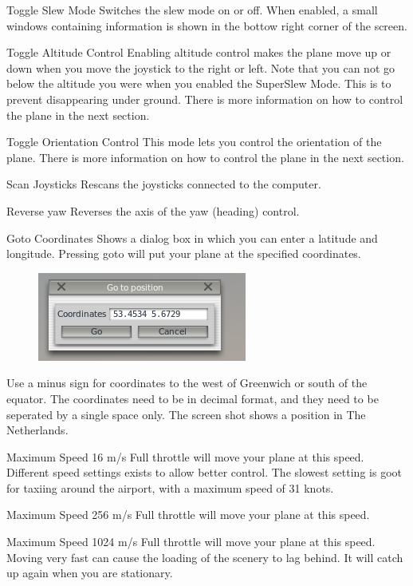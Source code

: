 \documentclass[a4paper,12pt]{article}
\newenvironment{vlist}[1]{%
\begin{list}{}{%
    \settowidth{\labelwidth}{\tt #1 }     %
    \setlength{\leftmargin}{\labelwidth}  %
    \addtolength{\leftmargin}{\labelsep}  %
    \setlength{\parsep}{0.5ex plus 0.2ex minus 0.2ex}
    \setlength{\itemsep}{0.3ex}
    \renewcommand{\makelabel}[1]{\color{headings}\tt ##1 \color{text1}\hfill}}}%
{\end{list}}
\begin{document}
\begin{vlist}{w}

\item[Toggle Slew Mode] Switches the slew mode on or
off. When enabled, a small windows containing information is shown in
the bottow right corner of the screen. 

\item[Toggle Altitude Control] Enabling altitude control makes the
  plane move up or down when you move the joystick to the right or
  left. Note that you can not go below the altitude you were when you
  enabled the SuperSlew Mode. This is to prevent disappearing under
  ground. There is more information on how to control the plane in the
  next section.

\item[Toggle Orientation Control] This mode lets you control the
  orientation of the plane. There is more information on how to
  control the plane in the next section.

\item[Scan Joysticks] Rescans the joysticks connected to the computer.

\item[Reverse yaw] Reverses the axis of the yaw (heading) control.

\item[Goto Coordinates] Shows a dialog box in which you can enter a
  latitude and longitude. Pressing goto will put your plane at the
  specified coordinates.
\begin{figure}[h!]%
\centering
\includegraphics[scale=1]{slewgoto.png}
\label{fig:infowindow}
\end{figure}
Use a minus sign for coordinates to the west of Greenwich or south
of the equator. The coordinates need to be in decimal format, and they need
to be seperated by a single space only. The screen shot shows a
position in The Netherlands.

\item[Maximum Speed 16 m/s] Full throttle will move your plane at this
  speed. Different speed settings exists to allow better control. The
  slowest setting is goot for taxiing around the airport, with a
  maximum speed of 31 knots.

\item[Maximum Speed 256 m/s] Full throttle will move your plane at this
  speed. 

\item[Maximum Speed 1024 m/s] Full throttle will move your plane at this
  speed. Moving very fast can cause the loading of the scenery to lag
  behind. It will catch up again when you are stationary.

\end{vlist}{}
\end{document}
